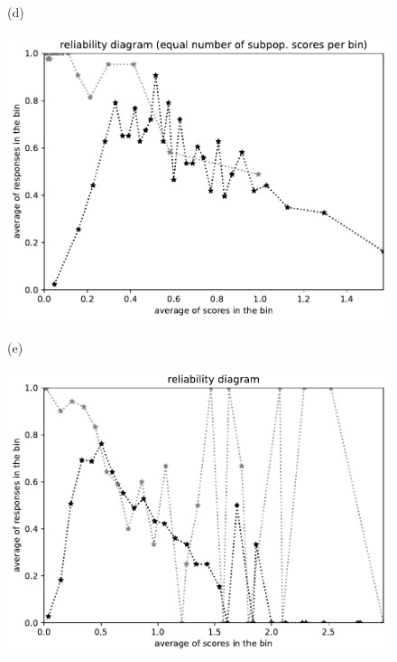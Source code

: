 \documentclass{article}
\newlength{\vertsep}
\newlength{\imsize}
\begin{document}
\begin{figure}
\begin{centering}
(d)
\parbox{\imsize}{\includegraphics[width=\imsize]
{../codes/unweighted/nll-1-248-Eskimo-dog-husky_293-cheetah-chetah-Acinonyx-jubatusequisamps30.pdf}}
\quad\quad
(e)
\parbox{\imsize}{\includegraphics[width=\imsize]
{../codes/unweighted/nll-1-248-Eskimo-dog-husky_293-cheetah-chetah-Acinonyx-jubatusequiscore30.pdf}}

\vspace{\vertsep}


\end{centering}
\end{figure}
\end{document}
